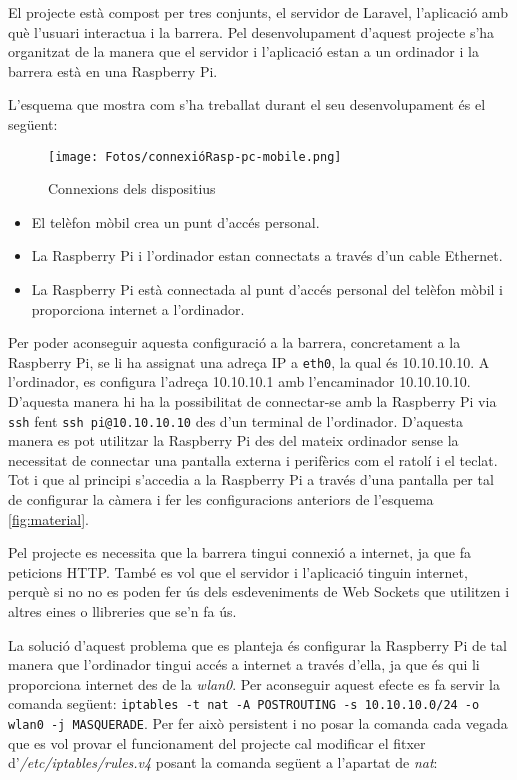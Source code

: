 El projecte està compost per tres conjunts, el servidor de Laravel,
l'aplicació amb què l'usuari interactua i la barrera.
Pel desenvolupament d'aquest projecte s'ha organitzat de la manera que
el servidor i l'aplicació estan a un ordinador i la barrera està en una Raspberry Pi.

L'esquema que mostra com s'ha treballat durant el seu desenvolupament
és el següent:

\begin{figure}[H]
    \begin{center}
        \texttt{[image: Fotos/connexióRasp-pc-mobile.png]}
    \end{center}
    \caption{Connexions dels dispositius}
    \label{fig:material}
\end{figure}

\begin{itemize}
    \item El telèfon mòbil crea un punt d'accés personal.
    \item La Raspberry Pi i l'ordinador estan connectats a través d'un cable
    Ethernet.
    \item La Raspberry Pi està connectada al punt d'accés personal del telèfon mòbil
    i proporciona internet a l'ordinador.
\end{itemize}

Per poder aconseguir aquesta configuració a la barrera, concretament a la Raspberry Pi, se li ha assignat una
adreça IP a \texttt{eth0}, la qual és 10.10.10.10.
A l'ordinador, es configura l'adreça 10.10.10.1 amb l'encaminador 10.10.10.10.
D'aquesta manera hi ha la possibilitat de connectar-se amb la Raspberry Pi
via \texttt{ssh} fent \texttt{ssh pi@10.10.10.10} des d'un terminal de l'ordinador.
D'aquesta manera es pot utilitzar la Raspberry Pi des del mateix ordinador
sense la necessitat de connectar una pantalla externa i perifèrics com el ratolí
i el teclat. Tot i que al principi s'accedia a la Raspberry Pi a través d'una pantalla
per tal de configurar la càmera i fer les configuracions anteriors de l'esquema \autoref{fig:material}.

Pel projecte es necessita que la barrera tingui connexió a internet, ja que
fa peticions HTTP. També es vol que el servidor i l'aplicació tinguin internet,
perquè si no no es poden fer ús dels esdeveniments de Web Sockets que utilitzen
i altres eines o llibreries que se'n fa ús.

La solució d'aquest problema que es planteja és
configurar la Raspberry Pi de tal manera que l'ordinador tingui accés a internet a través d'ella, ja que és qui li proporciona internet des de la \emph{wlan0}.
Per aconseguir aquest efecte es fa servir la comanda següent:
\texttt{iptables -t nat -A POSTROUTING -s 10.10.10.0/24 -o wlan0 -j MASQUERADE}.
Per fer això persistent i no posar la comanda cada vegada que es vol
provar el funcionament del projecte cal modificar el fitxer d'\emph{/etc/iptables/rules.v4}
posant la comanda següent a l'apartat de \emph{nat}:


